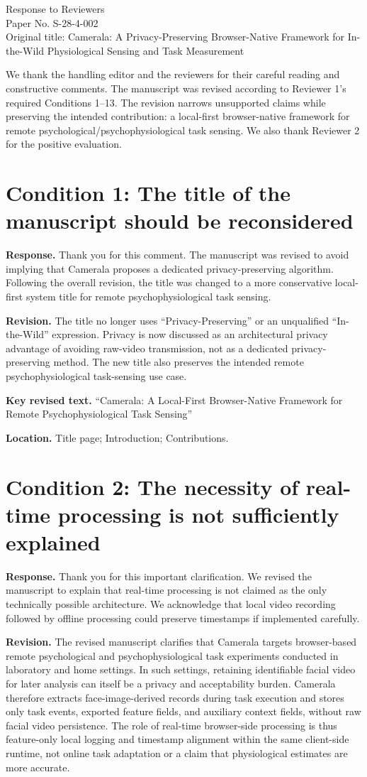 \documentclass[11pt]{article}
\newcommand{\condition}[2]{\section*{Condition #1: #2}}
\begin{document}
\begin{center}
{\Large Response to Reviewers}\\[4pt]
Paper No. S-28-4-002\\
Original title: Camerala: A Privacy-Preserving Browser-Native Framework for In-the-Wild Physiological Sensing and Task Measurement
\end{center}

We thank the handling editor and the reviewers for their careful reading and constructive comments.
The manuscript was revised according to Reviewer 1's required Conditions 1--13.
The revision narrows unsupported claims while preserving the intended contribution: a local-first browser-native framework for remote psychological/psychophysiological task sensing.
We also thank Reviewer 2 for the positive evaluation.

\condition{1}{The title of the manuscript should be reconsidered}
\textbf{Response.}
Thank you for this comment.
The manuscript was revised to avoid implying that Camerala proposes a dedicated privacy-preserving algorithm.
Following the overall revision, the title was changed to a more conservative local-first system title for remote psychophysiological task sensing.

\textbf{Revision.}
The title no longer uses ``Privacy-Preserving'' or an unqualified ``In-the-Wild'' expression.
Privacy is now discussed as an architectural privacy advantage of avoiding raw-video transmission, not as a dedicated privacy-preserving method.
The new title also preserves the intended remote psychophysiological task-sensing use case.

\textbf{Key revised text.}
``Camerala: A Local-First Browser-Native Framework for Remote Psychophysiological Task Sensing''

\textbf{Location.}
Title page; Introduction; Contributions.

\condition{2}{The necessity of real-time processing is not sufficiently explained}
\textbf{Response.}
Thank you for this important clarification.
We revised the manuscript to explain that real-time processing is not claimed as the only technically possible architecture.
We acknowledge that local video recording followed by offline processing could preserve timestamps if implemented carefully.

\textbf{Revision.}
The revised manuscript clarifies that Camerala targets browser-based remote psychological and psychophysiological task experiments conducted in laboratory and home settings.
In such settings, retaining identifiable facial video for later analysis can itself be a privacy and acceptability burden.
Camerala therefore extracts face-image-derived records during task execution and stores only task events, exported feature fields, and auxiliary context fields, without raw facial video persistence.
The role of real-time browser-side processing is thus feature-only local logging and timestamp alignment within the same client-side runtime, not online task adaptation or a claim that physiological estimates are more accurate.
\end{document}
